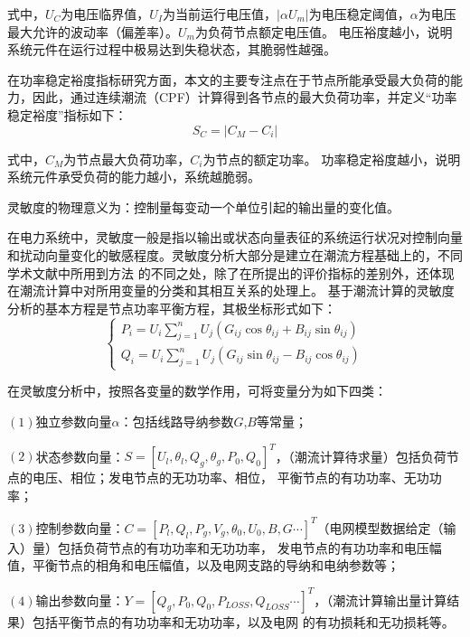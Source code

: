 式中，$U_C$为电压临界值，$U_I$为当前运行电压值，$\left|\alpha U_{m}\right|$为电压稳定阈值，$\alpha$为电压最大允许的波动率（偏差率）。$U_m$为负荷节点额定电压值。
电压裕度越小，说明系统元件在运行过程中极易达到失稳状态，其脆弱性越强。


在功率稳定裕度指标研究方面，本文的主要专注点在于节点所能承受最大负荷的能力，因此，通过连续潮流（CPF）计算得到各节点的最大负荷功率，并定义“功率稳定裕度”指标如下：
\begin{equation}
\label{equ:chap3:SC}
  S_C=\left|C_M-C_i\right|
  \end{equation}

式中，$C_M$为节点最大负荷功率，$C_i$为节点的额定功率。
功率稳定裕度越小，说明系统元件承受负荷的能力越小，系统越脆弱。

灵敏度的物理意义为：控制量每变动一个单位引起的输出量的变化值。

在电力系统中，灵敏度一般是指以输出或状态向量表征的系统运行状况对控制向量和扰动向量变化的敏感程度。灵敏度分析大部分是建立在潮流方程基础上的，不同学术文献中所用到方法
的不同之处，除了在所提出的评价指标的差别外，还体现在潮流计算中对所用变量的分类和其相互关系的处理上。
基于潮流计算的灵敏度分析的基本方程是节点功率平衡方程，其极坐标形式如下：
\begin{equation}
  \left\{\begin{array}{l}{P_{i}=U_{i} \sum_{j=1}^{n} U_{j}\left(G_{i j} \cos \theta_{i j}+B_{i j} \sin \theta_{i j}\right)} \\ 
{Q_{i}=U_{i} \sum_{j=1}^{n} U_{j}\left(G_{i j} \sin \theta_{i j}-B_{i j} \cos \theta_{i j}\right)}\end{array}\right.  
\end{equation}

在灵敏度分析中，按照各变量的数学作用，可将变量分为如下四类：

$(1)$独立参数向量$\alpha$：包括线路导纳参数$G$,$B$等常量；

$(2)$状态参数向量：$S=\left[U_{l}, \theta_{l}, Q_{g}, \theta_{g}, P_{0}, Q_{0}\right]^{T}$，（潮流计算待求量）包括负荷节点的电压、相位；发电节点的无功功率、相位，
平衡节点的有功功率、无功功率；

$(3)$控制参数向量：$C=\left[P_{l}, Q_{l}, P_{g}, V_{g}, \theta_{0}, U_{0}, B, G \cdots\right]^{T}$（电网模型数据给定（输入）量）包括负荷节点的有功功率和无功功率，
发电节点的有功功率和电压幅值，平衡节点的相角和电压幅值，以及电网支路的导纳和电纳参数等；

$(4)$输出参数向量：$Y=\left[Q_{g}, P_{0}, Q_{0}, P_{L O S S}, Q_{L O S S} \cdots\right]^{T}$，（潮流计算输出量计算结果）包括平衡节点的有功功率和无功功率，以及电网
的有功损耗和无功损耗等。

